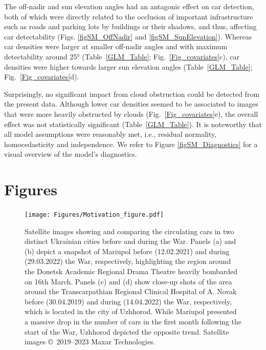 \documentclass[sn-basic]{sn-jnl}%
\begin{document}
{The off-nadir and sun elevation angles had an antagonic effect on car detection, both of which were directly related to the occlusion of important infrastructure such as roads and parking lots by buildings or their shadows, and thus, affecting car detectability (Figs. \ref{figSM_OffNadir} and \ref{figSM_SunElevation}). Whereas car densities were larger at smaller off-nadir angles and with maximum detectability around 25° (Table~\ref{GLM_Table}; Fig.~\ref{Fig_covariates}c), car densities were higher towards larger sun elevation angles (Table~\ref{GLM_Table}; Fig.~\ref{Fig_covariates}d). 

Surprisingly, no significant impact from cloud obstruction could be detected from the present data. Although lower car densities seemed to be associated to images that were more heavily obstructed by clouds (Fig.~\ref{Fig_covariates}e), the overall effect was not statistically significant (Table~\ref{GLM_Table}). It is noteworthy that all model assumptions were reasonably met, i.e., residual normality, homocedasticity and independence. We refer to Figure \ref{figSM_Diagnostics} for a visual overview of the model's diagnostics.


\newpage
\section*{Figures}\label{Figures}



\begin{figure}[h!]
\begin{center}
\texttt{[image: Figures/Motivation\_figure.pdf]}
\end{center}
\caption{Satellite images showing and comparing the circulating cars in two distinct Ukrainian cities before and during the War. Panels (a) and (b) depict a snapshot of Mariupol before (12.02.2021) and during (29.03.2022) the War, respectively, highlighting the region around the Donetsk Academic Regional Drama Theatre heavily bombarded on 16th March. Panels (c) and (d) show close-up shots of the area around the Transcarpathian Regional Clinical Hospital of A. Novak before (30.04.2019) and during (14.04.2022) the War, respectively, which is located in the city of Uzhhorod. While Mariupol presented a massive drop in the number of cars in the first month following the start of the War, Uzhhorod depicted the opposite trend. Satellite images \copyright~2019--2023 Maxar Technologies. 
}
\label{fig_motivationfig}
\end{figure}


}
\end{document}
